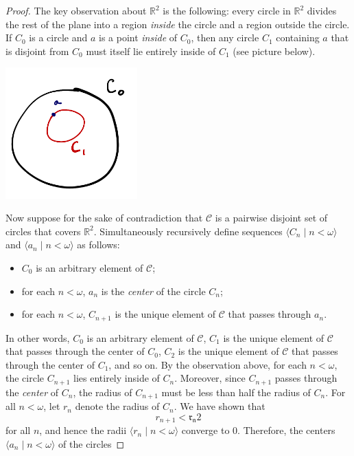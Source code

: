 \documentclass[a4paper]{memoir}
\theoremstyle{definition}
\newcommand{\bb}{\mathbb}
\newcommand{\mc}{\mathcal}
\begin{document}
\begin{proof}
  The key observation about $\bb{R}^2$ is the following: every circle in $\bb{R}^2$ divides the 
  rest of the plane into a region \emph{inside} the circle and a region outside the circle. If 
  $C_0$ is a circle and $a$ is a point 
  \emph{inside} of $C_0$, then any circle $C_1$ containing $a$ that is disjoint from $C_0$ must 
  itself lie entirely inside of $C_1$ (see picture below).
  \begin{center}
    \includegraphics[width=2in]{nesting_circles}
  \end{center}
  Now suppose for the sake of contradiction that $\mc{C}$ is a pairwise disjoint set of circles 
  that covers $\bb{R}^2$. Simultaneously recursively define sequences $\langle C_n \mid n < \omega 
  \rangle$ and $\langle a_n \mid n < \omega \rangle$ as follows:
  \begin{itemize}
    \item $C_0$ is an arbitrary element of $\mc{C}$;
    \item for each $n < \omega$, $a_n$ is the \emph{center} of the circle $C_n$;
    \item for each $n < \omega$, $C_{n+1}$ is the unique element of $\mc{C}$ that passes through 
    $a_n$.
  \end{itemize}
  In other words, $C_0$ is an arbitrary element of $\mc{C}$, $C_1$ is the unique element of $\mc{C}$ 
  that passes through the center of $C_0$, $C_2$ is the unique element of $\mc{C}$ that passes 
  through the center of $C_1$, and so on. By the observation above, for each $n < \omega$, the circle 
  $C_{n+1}$ lies entirely inside of $C_n$. Moreover, since $C_{n+1}$ passes through the \emph{center} 
  of $C_n$, the radius of $C_{n+1}$ must be less than half the radius of $C_n$. For all 
  $n < \omega$, let $r_n$ denote the radius of $C_n$. We have shown that 
  \[
    r_{n+1} < \mathfrak{r_n}{2}
  \]
  for all $n$, and hence the radii $\langle r_n \mid n < \omega \rangle$ converge to $0$. 
  Therefore, the centers $\langle a_n \mid n < \omega \rangle$ of the circles 

\end{proof}
\end{document}
